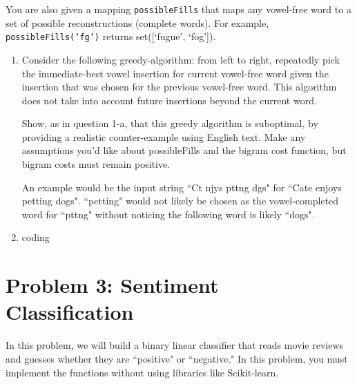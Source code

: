 \documentclass[10pt]{article}
\begin{document}
You are also given a mapping \texttt{possibleFills} that maps any vowel-free word to a set of possible reconstructions (complete words). For example, \texttt{possibleFills(`fg')} returns set([`fugue', `fog']). 

\begin{enumerate}[label=(\alph*)]

  \item  Consider the following greedy-algorithm: from left to right, repeatedly pick the immediate-best vowel insertion for current vowel-free word given the insertion that was chosen for the previous vowel-free word. This algorithm does not take into account future insertions beyond the current word.

Show, as in question 1-a, that this greedy algorithm is suboptimal, by providing a realistic counter-example using English text. Make any assumptions you'd like about possibleFills and the bigram cost function, but bigram costs must remain positive.

	An example would be the input string ``Ct njys pttng dgs" for ``Cate enjoys petting dogs". ``petting" would not likely be chosen as the vowel-completed word for ``pttng" without noticing the following word is likely ``dogs".
  
  \item coding

\end{enumerate}

\iffalse
\section*{\normalsize Problem 3: Sentiment Classification}

In this problem, we will build a binary linear classifier that reads movie reviews and guesses whether they are ``positive" or ``negative." In this problem, you must implement the functions without using libraries like Scikit-learn.
\end{document}
